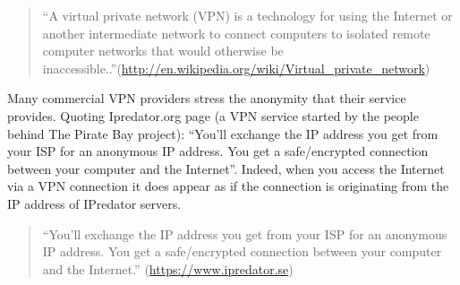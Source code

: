 \begin{quote}
``A virtual private network (VPN) is a technology for using the Internet
or another intermediate network to connect computers to isolated remote
computer networks that would otherwise be
inaccessible..''(\href{http://en.wikipedia.org/wiki/Virtual\_private\_network}{http://en.wikipedia.org/wiki/Virtual\_private\_network})

\end{quote}
Many commercial VPN providers stress the anonymity that their service
provides. Quoting Ipredator.org page (a VPN service started by the
people behind The Pirate Bay project): ``You'll exchange the IP address
you get from your ISP for an anonymous IP address. You get a
safe/encrypted connection between your computer and the Internet''.
Indeed, when you access the Internet via a VPN connection it does appear
as if the connection is originating from the IP address of IPredator
servers.

\begin{quote}
``You'll exchange the IP address you get from your ISP for an anonymous
IP address. You get a safe/encrypted connection between your computer
and the Internet.''
(\href{https://www.ipredator.se}{https://www.ipredator.se})

\end{quote}
